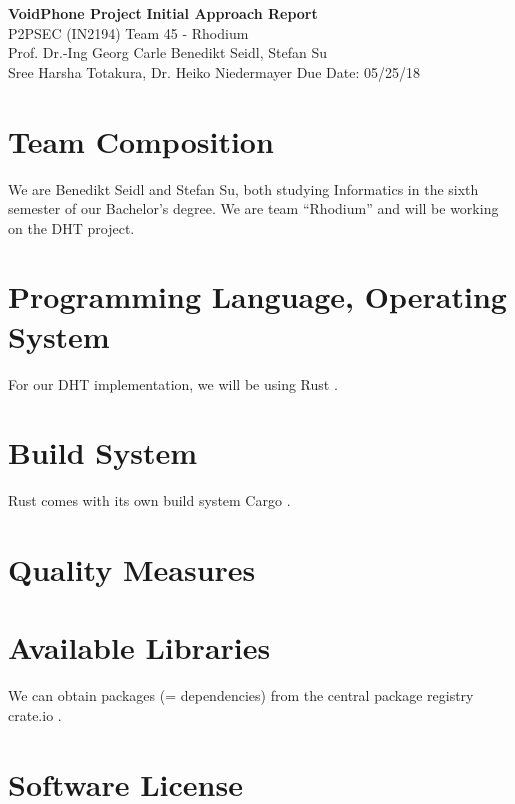 \documentclass[a4paper, 11pt]{article}
\begin{document}
\noindent
\large\textbf{VoidPhone Project} \hfill \textbf{Initial Approach Report} \\
\normalsize P2PSEC (IN2194)  \hfill Team 45 - Rhodium\\
Prof. Dr.-Ing Georg Carle \hfill Benedikt Seidl, Stefan Su \\
Sree Harsha Totakura, Dr. Heiko Niedermayer \hfill Due Date: 05/25/18

\section*{Team Composition}
We are Benedikt Seidl and Stefan Su, both studying Informatics in the sixth semester of our Bachelor's degree. We are team ``Rhodium'' and will be working on the DHT project.

\section*{Programming Language, Operating System}
For our DHT implementation, we will be using Rust \cite{Rust}. 

\section*{Build System}
Rust comes with its own build system Cargo \cite{Cargo} . 

\section*{Quality Measures}
\lipsum[4]

\section*{Available Libraries}
We can obtain packages (= dependencies) from the central package registry crate.io \cite{Cargo}. 

\section*{Software License}
\lipsum[6]
\end{document}

